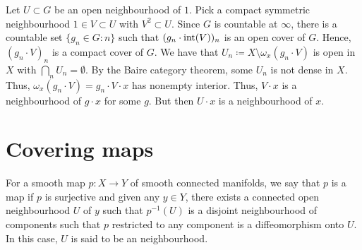 \documentclass[12pt]{article}
\begin{document}
\begin{sketch}
	Let $U \subset G$ be an open neighbourhood of $1$. 
	Pick a compact symmetric neighbourhood $1 \in V \subset U$ with $V^{2} \subset U$. 
	Since $G$ is countable at $\infty$, 
	there is a countable set $\{g_{n} \in G : n\}$ such that 
	$(g_{n} \cdot \operatorname{int}(V))_{n}$ is an open cover of $G$. 
	Hence, $(g_{n} \cdot V)_{n}$ is a compact cover of $G$. 
	We have that $U_{n} \coloneqq X \setminus \omega_{x}(g_{n} \cdot V)$ is open in $X$ with $\bigcap_{n} U_{n} = \emptyset$. 
	By the Baire category theorem, some $U_{n}$ is not dense in $X$. 
	Thus, $\omega_{x}(g_{n} \cdot V) = g_{n} \cdot V \cdot x$ has nonempty interior. 
	Thus, $V \cdot x$ is a neighbourhood of $g \cdot x$ for some $g$. 
	But then $U \cdot x$ is a neighbourhood of $x$.
\end{sketch}

\section{Covering maps}

For a smooth map $p \colon X \to Y$ of smooth connected manifolds, we say that $p$ is a  map 
if $p$ is surjective and given any $y \in Y$, 
there exists a connected open neighbourhood $U$ of $y$ such that 
$p^{-1}(U)$ is a disjoint neighbourhood of components such that 
$p$ restricted to any component is a diffeomorphism onto $U$. \newline
In this case, $U$ is said to be an  neighbourhood.
\end{document}
